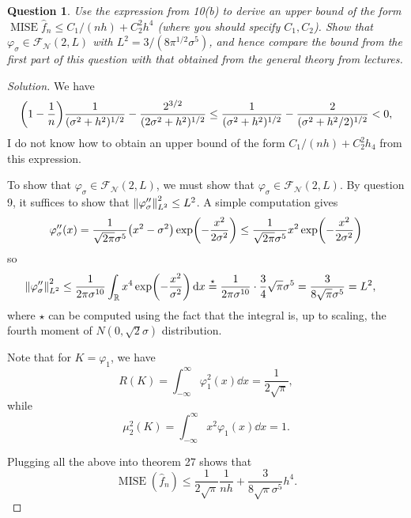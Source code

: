 \documentclass{article}
\theoremstyle{plain}
\newtheorem{question}{Question}
\theoremstyle{remark}
\newenvironment{solution}{\begin{proof}[Solution]\renewcommand\qedsymbol{}}{\end{proof}}
\renewcommand{\phi}{\varphi}
\newcommand{\Bb}{\mathbb}
\newcommand{\Cal}{\mathcal}
\newcommand{\RR}{\Bb R}
\newcommand\FF{\Cal F}
\newcommand\Nn{\Cal N}
\DeclareMathOperator\MISE{MISE}
\begin{document}
\begin{question}
	Use the expression from 10(b) to derive an upper bound of the form $\MISE \hat f_n \leq C_1/(nh) + C_2^2 h^4$ (where you should specify $C_1, C_2$). Show that $\phi_\sigma \in \FF_\Nn(2, L)$ with $L^2 = 3/(8 \pi^{1/2} \sigma^5)$, and hence compare the bound from the first part of this question with that obtained from the general theory from lectures. 
\end{question}

\begin{solution}
	We have 
	\[
	\qty(1 - \frac1n) \frac{1}{(\sigma^2 + h^2)^{1/2}} - \frac{2^{3/2}}{(2\sigma^2 + h^2)^{1/2}} \leq \frac{1}{(\sigma^2 + h^2)^{1/2}}  - \frac{2}{(\sigma^2 + h^2/2)^{1/2}} < 0,
	\]
	I do not know how to obtain an upper bound of the form $C_1/(nh) + C_2^2 h_4$ from this expression. 
	
	To show that $\phi_\sigma \in \FF_\Nn(2, L)$,  we must show that $\phi_\sigma \in \FF_\Nn(2, L)$. By question 9, it suffices to show that $\norm{\phi''_\sigma}_{L^2}^2 \leq L^2$. 
	A simple computation gives
	\[
	\phi_\sigma''(x) = \frac{1}{\sqrt{2\pi} \sigma^5} \qty(x^2 - \sigma^2) \exp(-\frac{x^2}{2\sigma^2}) \leq \frac1{\sqrt{2\pi} \sigma^5} x^2 \exp(-\frac{x^2}{2\sigma^2})
	\]
	so
	\begin{align*}
	\norm{\phi_\sigma''}_{L^2}^2 &\leq \frac{1}{2\pi\sigma^{10}} \int_\RR x^4 \exp(-\frac{x^2}{\sigma^2}) \dd{x} \overset\star= \frac{1}{2\pi \sigma^{10}} \cdot \frac34 \sqrt{\pi} \sigma^5 = \frac{3}{8 \sqrt\pi \sigma^5} = L^2, 
	\end{align*}
where $\star$ can be computed using the fact that the integral is, up to scaling, the fourth moment of $N(0, \sqrt2\sigma)$ distribution. 

Note that for $K = \phi_1$, we have 
\[
R(K) = \int_{-\infty}^\infty \phi_1^2(x) \dd{x} = \frac1{2\sqrt\pi}, 
\]
while
\[
\mu_2^2(K)=  \int_{-\infty}^\infty x^2 \phi_1(x) \dd{x} = 1.
\]

Plugging all the above into theorem 27 shows that 
\[
\MISE(\hat f_n) \leq \frac{1}{2\sqrt\pi} \frac1{nh} + \frac{3}{8\sqrt\pi \sigma^5} h^4.
\]
\end{solution}
\end{document}

